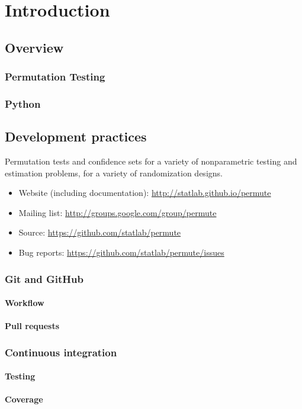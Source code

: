 \chapter{Introduction}

\section{Overview}

\subsection{Permutation Testing}

\subsection{Python}

\cite{millman2011python, Perez2011}

\section{Development practices}

Permutation tests and confidence sets for a variety of nonparametric testing
and estimation problems, for a variety of randomization designs.

\begin{itemize}
\item Website (including documentation): \url{http://statlab.github.io/permute}
\item Mailing list: \url{http://groups.google.com/group/permute}
\item Source: \url{https://github.com/statlab/permute}
\item Bug reports: \url{https://github.com/statlab/permute/issues}
\end{itemize}


\cite{millman2014}

\subsection{Git and GitHub}

\subsubsection{Workflow}
\subsubsection{Pull requests}

\subsection{Continuous integration}

\subsubsection{Testing}
\subsubsection{Coverage}
